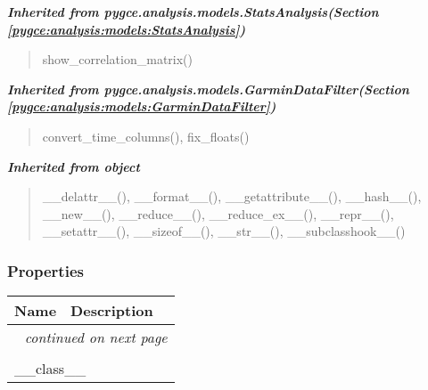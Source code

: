 \large{\textbf{\textit{Inherited from pygce.analysis.models.StatsAnalysis\textit{(Section \ref{pygce:analysis:models:StatsAnalysis})}}}}

\begin{quote}
show\_correlation\_matrix()
\end{quote}

\large{\textbf{\textit{Inherited from pygce.analysis.models.GarminDataFilter\textit{(Section \ref{pygce:analysis:models:GarminDataFilter})}}}}

\begin{quote}
convert\_time\_columns(), fix\_floats()
\end{quote}

\large{\textbf{\textit{Inherited from object}}}

\begin{quote}
\_\_delattr\_\_(), \_\_format\_\_(), \_\_getattribute\_\_(), \_\_hash\_\_(), \_\_new\_\_(), \_\_reduce\_\_(), \_\_reduce\_ex\_\_(), \_\_repr\_\_(), \_\_setattr\_\_(), \_\_sizeof\_\_(), \_\_str\_\_(), \_\_subclasshook\_\_()
\end{quote}


  \subsubsection{Properties}

    \vspace{-1cm}
\hspace{\varindent}\begin{longtable}{|p{\varnamewidth}|p{\vardescrwidth}|l}
\cline{1-2}
\cline{1-2} \centering \textbf{Name} & \centering \textbf{Description}& \\
\cline{1-2}
\endhead\cline{1-2}\multicolumn{3}{r}{\small\textit{continued on next page}}\\\endfoot\cline{1-2}
\endlastfoot\multicolumn{2}{|l|}{\textit{Inherited from object}}\\
\multicolumn{2}{|p{\varwidth}|}{\raggedright \_\_class\_\_}\\
\cline{1-2}
\end{longtable}



